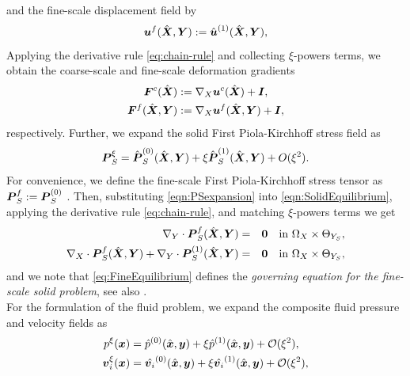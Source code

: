 \documentclass[preprint,3p,12pt,number,sort&compress]{elsarticle}
\def\vec   #1{\text{\boldmath $#1$}{}}
\def\ten   #1{\text{\boldmath $#1$}{}}
\begin{document}
and the fine-scale displacement field by
\begin{equation}
    \vec u^f(\hat{\vec X},\vec Y) := \hat{\vec u}^{(1)}(\hat{\vec X}, \vec Y),   
\end{equation}
Applying the derivative rule \eqref{eq:chain-rule} and collecting $\xi$-powers terms, we obtain the coarse-scale and fine-scale deformation gradients \cite{concha2020upscaling}
\begin{align}
	\ten F^c(\hat{\vec X}) &:=  \nabla_X \vec u^c(\hat{\vec X})  + \ten I,\\
	\ten F^f(\hat{\vec X}, \vec Y) &:=  \nabla_X \vec u^f(\hat{\vec X}, \vec Y) + \ten I,
\end{align}
respectively. Further, we expand the solid First Piola-Kirchhoff stress field as
\begin{equation}
\ten{P}_S^{\xi}=\hat{\ten{P}}_S^{(0)}(\hat{\vec X}, \vec Y)+\xi \hat{\ten{P}}_S^{(1)}(\hat{\vec X}, \vec Y)+O(\xi^2). \label{eqn:PSexpansion}
\end{equation}  
For convenience, we define the fine-scale First Piola-Kirchhoff stress tensor as $	\ten P_S^{f}:= \ten P_S^{(0)}$ \cite{fish2013practical}. Then, substituting \eqref{eqn:PSexpansion} into \eqref{eqn:SolidEquilibrium}, applying the derivative rule \eqref{eq:chain-rule}, and matching $\xi$-powers terms we get
\begin{eqnarray}
	 \nabla_Y \cdot {\ten P_S^{f}(\hat{\vec X}, \vec Y)} &=& \vec 0 \quad \mbox{in } \Omega_X \times \Theta_{Y_S}, \label{eq:FineEquilibrium} \\
	\nabla_X \cdot \ten P_S^{f} (\hat{\vec X}, \vec Y) + \nabla_Y \cdot \ten P_S^{(1)}(\hat{\vec X}, \vec Y) &=& \vec 0 \quad \mbox{in } \Omega_X \times\Theta_{Y_S}, \label{eq:CoarseEquilibrium}
\end{eqnarray}
and we note that \eqref{eq:FineEquilibrium} defines the {\it governing equation for the fine-scale solid problem}, see also \cite{concha2020upscaling}.\\ 
For the formulation of the fluid problem, we expand the composite fluid pressure and velocity fields as 
\begin{align}
	p^{\xi} (\vec x) &= \hat{p}^{(0)} (\hat{\vec x}, \vec y) + \xi \hat{p}^{(1)}(\hat{\vec x}, \vec y) + \mathcal O(\xi^2), \label{eq:AsymptoticPressure} \\
	\vec v_i^{\xi} (\vec x) &= \hat{\vec v_i}^{(0)} (\hat{\vec x}, \vec y) + \xi \hat{\vec v_i}^{(1)}(\hat{\vec x}, \vec y) + \mathcal O(\xi^2),  \label{eq:AsymptoticVelocity}
\end{align}
\end{document}
